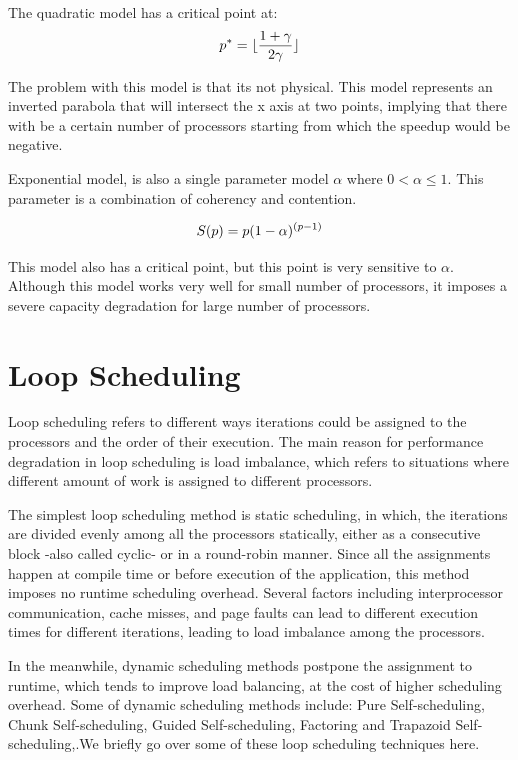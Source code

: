 The quadratic model has a critical point at: 
\begin{equation}\label{quad_critical}
p^* = \lfloor\frac{1+\gamma}{2\gamma}\rfloor \\
\end{equation}

The problem with this model is that its not physical. This model represents an inverted parabola that will intersect the x axis at two points, implying that there with be a certain number of processors starting from which the speedup would be negative. 


Exponential model, is also a single parameter model $\alpha$ where $0<\alpha\leqslant1$. This parameter is a combination of coherency and contention. 

\begin{equation}\label{expo}
S(p) = p(1-\alpha)^{(p-1)}\\
\end{equation}

This model also has a critical point, but this point is very sensitive to $\alpha$. Although this model works very well for small number of processors, it imposes a severe capacity degradation for large number of processors.

\vspace{\baselineskip}
\section{Loop Scheduling}
Loop scheduling refers to different ways iterations could be assigned to the processors and the order of their execution. 
The main reason for performance degradation in loop scheduling is load imbalance, which refers to situations where different amount of work is assigned to different processors\cite{ciorba2018openmp}.    

The simplest loop scheduling method is static scheduling, in which, the iterations are divided evenly among all the processors statically, either as a consecutive block -also called cyclic- or in a round-robin manner\cite{liu1994safe}. Since all the assignments happen at compile time or before execution of the application, this method imposes no runtime scheduling overhead. Several factors including interprocessor communication, cache misses, and page faults can lead to different execution times for different iterations, leading to load imbalance among the processors\cite{philip1995increasing}.

In the meanwhile, dynamic scheduling methods postpone the assignment to runtime, which tends to improve load balancing, at the cost of higher scheduling overhead. Some of dynamic scheduling methods include: Pure Self-scheduling, Chunk Self-scheduling, Guided Self-scheduling\cite{polychronopoulos1987guided}, Factoring\cite{hummel1992factoring} and Trapazoid Self-scheduling\cite{tzen1993trapezoid},\cite{liu1994safe}.We briefly go over some of these loop scheduling techniques here.


